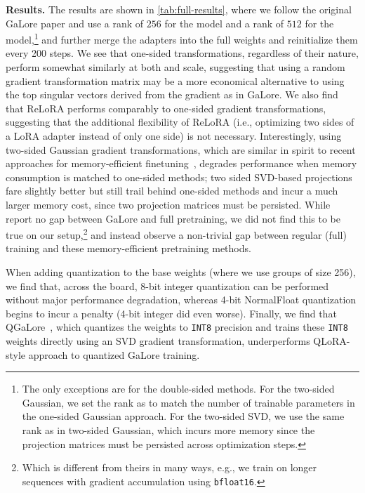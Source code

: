 \noindent\textbf{Results.}
The results are shown in \cref{tab:full-results}, where we follow the original GaLore paper and use a rank of $256$ for the \tinyB model and a rank of $512$ for the \largeB model,\footnote{The only exceptions are for the double-sided methods. For the two-sided Gaussian,  we set the rank as to match the number of trainable parameters in the one-sided Gaussian approach. For the two-sided SVD, we use the same rank as in two-sided Gaussian, which incurs more memory since the projection matrices must be persisted across optimization steps.} and further merge the  adapters into the full weights and reinitialize them every 200 steps. 
We see that one-sided transformations, regardless of their nature, perform somewhat similarly at both \tinyB and \largeB scale, suggesting that  using a random gradient transformation matrix may be a more economical alternative to using the top singular vectors derived from the gradient as in GaLore.
We also find that ReLoRA performs comparably to one-sided gradient transformations, suggesting that the additional flexibility of ReLoRA (i.e., optimizing two sides of a LoRA adapter instead of only one side) is not necessary.
Interestingly, using two-sided Gaussian gradient transformations, which are similar in spirit to recent approaches for memory-efficient finetuning~\citep{mora,balazy2024lora,wang2024pmss}, degrades performance when memory consumption is matched to one-sided methods;
two sided SVD-based projections fare slightly better but still trail behind one-sided methods and incur a much larger memory cost, since two projection matrices must be persisted.
While \citet{galore} report no gap between GaLore and full pretraining, we did not find this to be true on our setup,\footnote{Which is different from theirs in many ways, e.g., we train on longer sequences with gradient accumulation using \texttt{bfloat16}.} and instead observe a non-trivial gap between regular (full) training and these memory-efficient pretraining methods.




When adding quantization to the base weights (where we use groups of size 256), we find that, across the board, 8-bit integer quantization can be performed without major performance degradation, whereas 4-bit NormalFloat quantization  begins to incur a penalty (4-bit integer did even worse).
Finally, we find that QGaLore~\citep{qgalore}, which quantizes the weights to \texttt{INT8} precision and trains these \texttt{INT8} weights directly using an SVD gradient transformation, underperforms QLoRA-style approach to quantized GaLore training.

